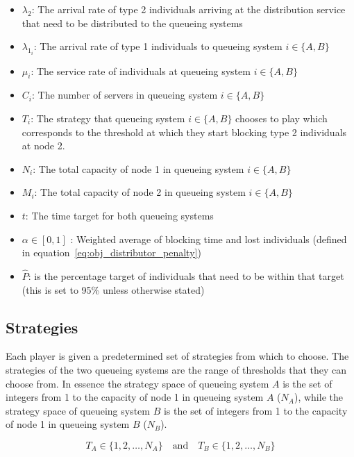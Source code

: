 \begin{itemize}
    \item \(\lambda_2\): The arrival rate of type 2 individuals arriving at the
    distribution service that need to be distributed to the queueing systems
    \item \(\lambda_{1_i}\): The arrival rate of type 1 individuals to queueing
    system \(i\in\{A, B\}\)
    \item \(\mu_i\): The service rate of individuals at queueing system
    \(i\in\{A, B\}\)
    \item \(C_i\): The number of servers in queueing system \(i\in\{A, B\}\)
    \item \(T_i\): The strategy that queueing system \(i\in\{A, B\} \) chooses
    to play which corresponds to the threshold at which they start blocking
    type 2 individuals at node 2.
    \item \(N_i\): The total capacity of node 1 in queueing system
    \(i\in\{A, B\}\)
    \item \(M_i\): The total capacity of node 2 in queueing system
    \(i\in\{A, B\}\)
    \item \(t\): The time target for both queueing systems
    \item \(\alpha \in [0, 1]\) : Weighted average of blocking time and
    lost individuals (defined in equation~\eqref{eq:obj_distributor_penalty})
    \item \(\hat{P}\): is the percentage target of individuals that need to be
    within that target (this is set to 95\% unless otherwise stated)
\end{itemize}

\subsection{Strategies}\label{sec:game_strategies}

Each player is given a predetermined set of strategies from which to choose.
The strategies of the two queueing systems are the range of thresholds that they
can choose from.
In essence the strategy space of queueing system \(A\) is the set of integers
from
1 to the capacity of node 1 in queueing system \(A\) (\(N_A\)), while the
strategy space of queueing system \(B\) is the set of integers from 1 to the
capacity of node 1 in queueing system \(B\) (\(N_B\)).

\begin{equation}\label{eq:game_strategy_space_queueing_systems}
    T_A \in \{1, 2, \ldots, N_A\} \quad \text{and} \quad
    T_B \in \{1, 2, \ldots, N_B\}
\end{equation}

